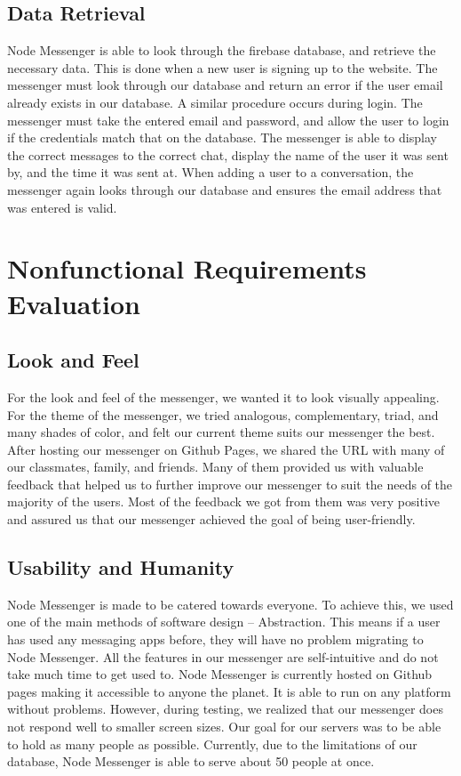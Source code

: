 \documentclass[12pt, titlepage]{article}
\begin{document}
	\subsection{Data Retrieval}
	Node Messenger is able to look through the firebase database, and retrieve the necessary data. This is done when a new user is signing up to the website. The messenger must look through our database and return an error if the user email already exists in our database. A similar procedure occurs during login. The messenger must take the entered email and password, and allow the user to login if the credentials match that on the database. The messenger is able to display the correct messages to the correct chat, display the name of the user it was sent by, and the time it was sent at. When adding a user to a conversation, the messenger again looks through our database and ensures the email address that was entered is valid.

\section{Nonfunctional Requirements Evaluation}
	\subsection{Look and Feel}
	For the look and feel of the messenger, we wanted it to look visually appealing. For the theme of the messenger, we tried analogous, complementary, triad, and many shades of color, and felt our current theme suits our messenger the best. After hosting our messenger on Github Pages, we shared the URL with many of our classmates, family, and friends. Many of them provided us with valuable feedback that helped us to further improve our messenger to suit the needs of the majority of the users. Most of the feedback we got from them was very positive and assured us that our messenger achieved the goal of being user-friendly.  
	\subsection{Usability and Humanity}
	Node Messenger is made to be catered towards everyone. To achieve this, we used one of the main methods of software design – Abstraction. This means if a user has used any messaging apps before, they will have no problem migrating to Node Messenger. All the features in our messenger are self-intuitive and do not take much time to get used to. Node Messenger is currently hosted on Github pages making it accessible to anyone the planet. It is able to run on any platform without problems. However, during testing, we realized that our messenger does not respond well to smaller screen sizes. Our goal for our servers was to be able to hold as many people as possible. Currently, due to the limitations of our database, Node Messenger is able to serve about 50 people at once. 
\end{document}
